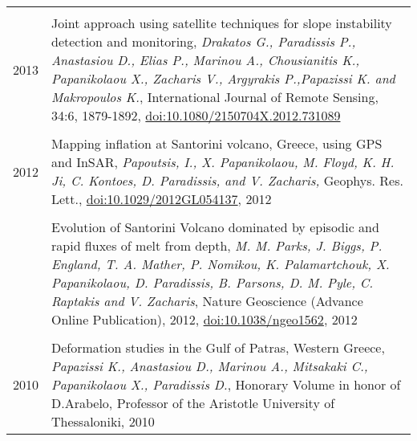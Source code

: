\documentclass[9pt]{extarticle} %
\begin{document}
\begin{longtable}{r|p{14cm}}
%  
\multicolumn{2}{c}{} \\ 
  \textsc{2013}
%
  & Joint approach using satellite techniques for slope instability detection and monitoring,
  \emph{Drakatos G., Paradissis P., Anastasiou D., Elias P., Marinou A., Chousianitis K., Papanikolaou X., Zacharis V., Argyrakis P.,Papazissi K. and Makropoulos K.},
  International Journal of Remote Sensing, 34:6, 1879-1892, \href{http://www.tandfonline.com/doi/abs/10.1080/2150704X.2012.731089#.Uxni9meIaig}{doi:10.1080/2150704X.2012.731089}\\
%
\multicolumn{2}{c}{} \\ 
  \textsc{2012}
  & Mapping inflation at Santorini volcano, Greece, using GPS and InSAR,
  \emph{Papoutsis, I., X. Papanikolaou, M. Floyd, K. H. Ji, C. Kontoes, D. Paradissis, and V. Zacharis,}
  Geophys. Res. Lett., \href{http://www.agu.org/pubs/crossref/pip/2012GL054137.shtml}{doi:10.1029/2012GL054137}, 2012\\
%
  &\\
%
  & Evolution of Santorini Volcano dominated by episodic and rapid fluxes of melt from depth,
  \emph{M. M. Parks, J. Biggs, P. England, T. A. Mather, P. Nomikou, K. Palamartchouk, X. Papanikolaou, D. Paradissis, B. Parsons, D. M. Pyle, C. Raptakis and V. Zacharis},
  Nature Geoscience (Advance Online Publication), 2012, \href{http://www.nature.com/ngeo/journal/v5/n10/full/ngeo1562.html}{doi:10.1038/ngeo1562}, 2012\\
%
\multicolumn{2}{c}{} \\ 
  \textsc{2010}
  & Deformation studies in the Gulf of Patras, Western Greece,
  \emph{Papazissi K., Anastasiou D., Marinou A., Mitsakaki C., Papanikolaou X., Paradissis D.}, 
  Honorary Volume in honor of D.Arabelo, Professor of the Aristotle University of Thessaloniki, 2010\\
\end{longtable}
%
\end{document}
